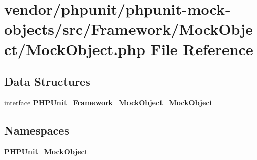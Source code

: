 \section{vendor/phpunit/phpunit-\/mock-\/objects/src/\+Framework/\+Mock\+Object/\+Mock\+Object.php File Reference}
\label{_mock_object_8php}
\subsection*{Data Structures}
\begin{DoxyCompactItemize}
\item 
interface {\bf P\+H\+P\+Unit\+\_\+\+Framework\+\_\+\+Mock\+Object\+\_\+\+Mock\+Object}
\end{DoxyCompactItemize}
\subsection*{Namespaces}
\begin{DoxyCompactItemize}
\item 
 {\bf P\+H\+P\+Unit\+\_\+\+Mock\+Object}
\end{DoxyCompactItemize}
